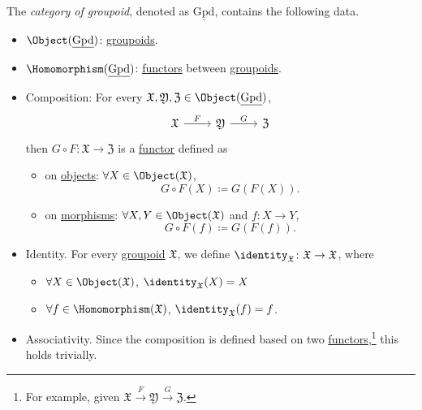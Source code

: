 \begin{definition}\label{def:category-of-groupoid}
	The \emph{category of groupoid}, denoted as \(\underline{\mathrm{Gpd}}\), contains the following data.
	\begin{itemize}
		\item \(\Object (\underline{\mathrm{Gpd}})\): \hyperref[def:groupoid]{groupoids}.
		\item \(\Homomorphism (\underline{\mathrm{Gpd}})\): \hyperref[def:functor]{functors} between \hyperref[def:groupoid]{groupoids}.
		\item Composition: For every \(\mathfrak{X} , \mathfrak{Y}, \mathfrak{Z} \in \Object (\underline{\mathrm{Gpd}})\),
		      \[
			      \begin{tikzcd}
				      {\mathfrak{X}} & {\mathfrak{Y}} & {\mathfrak{Z}}
				      \arrow["F", from=1-1, to=1-2]
				      \arrow["G", from=1-2, to=1-3]
			      \end{tikzcd}
		      \]
		      then \(G\circ F\colon \mathfrak{X} \to \mathfrak{Z}\) is a \hyperref[def:functor]{functor} defined as
		      \begin{itemize}
			      \item on \hyperref[def:object]{objects}: \(\forall X\in \Object (\mathfrak{X})\),
			            \[
				            G\circ F(X)\coloneqq G(F(X)).
			            \]
			      \item on \hyperref[def:morphism]{morphisms}: \(\forall X, Y\in \Object (\mathfrak{X})\) and \(f\colon X\to Y\),
			            \[
				            G\circ F(f)\coloneqq G(F(f)).
			            \]
		      \end{itemize}
		\item Identity. For every \hyperref[def:groupoid]{groupoid} \(\mathfrak{X}\), we define \(\identity_{\mathfrak{X}}\colon \mathfrak{X}\to \mathfrak{X} \), where
		      \begin{itemize}
			      \item \(\forall X\in \Object (\mathfrak{X})\), \(\identity_{\mathfrak{X}}(X) = X \)
			      \item \(\forall f\in \Homomorphism (\mathfrak{X})\), \(\identity_{\mathfrak{X}}(f) = f \).
		      \end{itemize}
		\item Associativity. Since the composition is defined based on two \hyperref[def:functor]{functors},\footnote{For example, given
			      \(\mathfrak{X} \overset{F}{\to } \mathfrak{Y} \overset{G}{\to } \mathfrak{Z}\).} this holds trivially.
	\end{itemize}
\end{definition}
